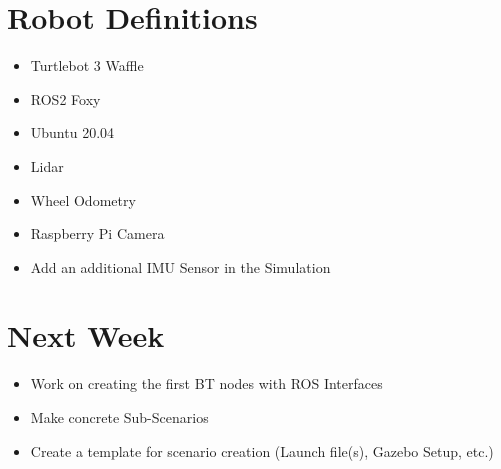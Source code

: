 \documentclass[10pt,a4paper]{article}
\begin{document}
\section{Robot Definitions}
\begin{itemize}
\item Turtlebot 3 Waffle
\item ROS2 Foxy
\item Ubuntu 20.04
\item Lidar
\item Wheel Odometry
\item Raspberry Pi Camera
\item Add an additional IMU Sensor in the Simulation


\end{itemize}



\section{Next Week}

\begin{itemize}
\item Work on creating the first BT nodes with ROS Interfaces
\item Make concrete Sub-Scenarios
\item Create a template for scenario creation (Launch file(s), Gazebo Setup, etc.)
\end{itemize}
\end{document}
